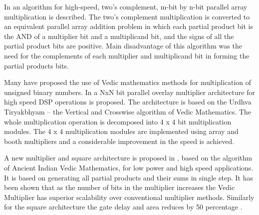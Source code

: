 
In \cite{r3} an algorithm for high-speed, two's complement, m-bit by n-bit parallel array multiplication is described. The two's complement multiplication is converted to an equivalent parallel array addition problem in which each partial product bit is the AND of a multiplier bit and a multiplicand bit, and the signs of all the partial product bits are positive. Main disadvantage of this algorithm was the need for the complements of each multiplier and multiplicand bit in forming the partial products bits.

Many have proposed the use of Vedic mathematics methods for multiplication of unsigned binary numbers. In \cite{r6} a NxN bit parallel overlay multiplier architecture for high speed DSP operations is proposed. The architecture is based on the Urdhva Tiryakbhyam – the Vertical and Crosswise algorithm of Vedic Mathematics. The whole multiplication operation is decomposed into 4 x 4 bit multiplication modules. The 4 x 4 multiplication modules are implemented using array and booth multipliers and a considerable improvement in the speed is achieved.


A new multiplier and square architecture is proposed in \cite{r4}, based on the algorithm of Ancient Indian Vedic Mathematics, for low power and high speed applications. It is based on generating all partial products and their sums in single step. It has been shown that as the number of bits in the multiplier increases the Vedic Multiplier has superior scalability over conventional multiplier methods. Similarly for the square architecture the gate delay and area reduces by 50 percentage \cite{r4}.

